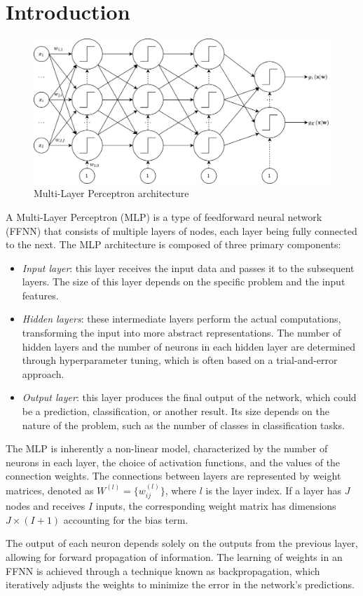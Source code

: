 \section{Introduction}

\begin{figure}[H]
    \centering
    \includegraphics[width=0.75\linewidth]{images/ffnn.png}
    \caption{Multi-Layer Perceptron architecture}
\end{figure}
A Multi-Layer Perceptron (MLP) is a type of feedforward neural network (FFNN) that consists of multiple layers of nodes, each layer being fully connected to the next. 
The MLP architecture is composed of three primary components:
\begin{itemize}
    \item \textit{Input layer}: this layer receives the input data and passes it to the subsequent layers. 
        The size of this layer depends on the specific problem and the input features.
    \item \textit{Hidden layers}: these intermediate layers perform the actual computations, transforming the input into more abstract representations. 
        The number of hidden layers and the number of neurons in each hidden layer are determined through hyperparameter tuning, which is often based on a trial-and-error approach.
    \item \textit{Output layer}: this layer produces the final output of the network, which could be a prediction, classification, or another result. 
        Its size depends on the nature of the problem, such as the number of classes in classification tasks.
\end{itemize}
The MLP is inherently a non-linear model, characterized by the number of neurons in each layer, the choice of activation functions, and the values of the connection weights.
The connections between layers are represented by weight matrices, denoted as $W^{(l)}=\{w_{ij}^{(l)}\}$, where $l$ is the layer index. 
If a layer has $J$ nodes and receives $I$ inputs, the corresponding weight matrix has dimensions $J \times (I+1)$ accounting for the bias term.

The output of each neuron depends solely on the outputs from the previous layer, allowing for forward propagation of information. 
The learning of weights in an FFNN is achieved through a technique known as backpropagation, which iteratively adjusts the weights to minimize the error in the network's predictions.